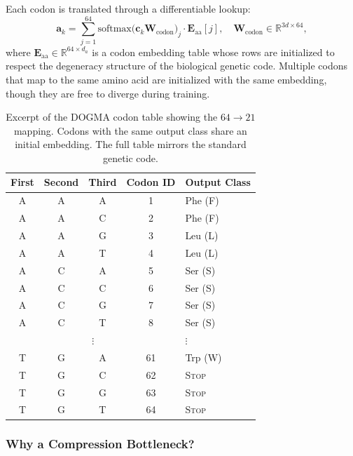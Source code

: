Each codon is translated through a differentiable lookup:
\begin{equation}
\mathbf{a}_k = \sum_{j=1}^{64} \mathrm{softmax}\bigl(\mathbf{c}_k \mathbf{W}_{\text{codon}}\bigr)_j \cdot \mathbf{E}_{\text{aa}}[j], \quad \mathbf{W}_{\text{codon}} \in \mathbb{R}^{3d \times 64},
\label{eq:codon-translate}
\end{equation}
where $\mathbf{E}_{\text{aa}} \in \mathbb{R}^{64 \times d_a}$ is a codon embedding table whose rows are initialized to respect the degeneracy structure of the biological genetic code. Multiple codons that map to the same amino acid are initialized with the same embedding, though they are free to diverge during training.

\begin{table}[H]
\centering
\caption{Excerpt of the DOGMA codon table showing the $64 \to 21$ mapping. Codons with the same output class share an initial embedding. The full table mirrors the standard genetic code.}
\label{tab:codon-table}
\renewcommand{\arraystretch}{1.1}
\footnotesize
\begin{tabular}{cccc|l}
\toprule
\textbf{First} & \textbf{Second} & \textbf{Third} & \textbf{Codon ID} & \textbf{Output Class} \\
\midrule
A & A & A & 1  & Phe (F) \\
A & A & C & 2  & Phe (F) \\
A & A & G & 3  & Leu (L) \\
A & A & T & 4  & Leu (L) \\
A & C & A & 5  & Ser (S) \\
A & C & C & 6  & Ser (S) \\
A & C & G & 7  & Ser (S) \\
A & C & T & 8  & Ser (S) \\
\multicolumn{4}{c|}{$\vdots$} & $\vdots$ \\
T & G & A & 61 & Trp (W) \\
T & G & C & 62 & \textsc{Stop} \\
T & G & G & 63 & \textsc{Stop} \\
T & G & T & 64 & \textsc{Stop} \\
\bottomrule
\end{tabular}
\end{table}

\subsubsection{Why a Compression Bottleneck?}


